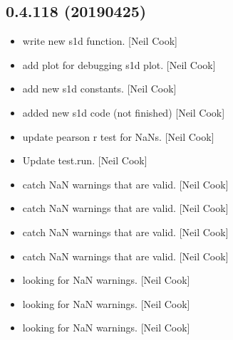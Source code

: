 \documentclass[a4paper,10pt,english]{report}
\begin{document}
\subsection{0.4.118 (2019\sphinxhyphen{}04\sphinxhyphen{}25)}
\label{\detokenize{misc/changelog:id162}}\begin{itemize}
\item {} 
 \sphinxhyphen{} write new s1d function. {[}Neil Cook{]}

\item {} 
 \sphinxhyphen{} add  plot for debugging s1d
plot. {[}Neil Cook{]}

\item {} 
 \sphinxhyphen{} add new s1d constants. {[}Neil Cook{]}

\item {} 
 \sphinxhyphen{} added new s1d code (not finished) {[}Neil
Cook{]}

\item {} 
 \sphinxhyphen{} update pearson r test for NaNs. {[}Neil Cook{]}

\item {} 
Update test.run. {[}Neil Cook{]}

\item {} 
 \sphinxhyphen{} catch NaN warnings that are valid. {[}Neil Cook{]}

\item {} 
 \sphinxhyphen{} catch NaN warnings that are valid. {[}Neil Cook{]}

\item {} 
 \sphinxhyphen{} catch NaN warnings that are valid. {[}Neil Cook{]}

\item {} 
 \sphinxhyphen{} catch NaN warnings that are valid. {[}Neil Cook{]}

\item {} 
 \sphinxhyphen{} looking for NaN warnings. {[}Neil Cook{]}

\item {} 
 \sphinxhyphen{} looking for NaN warnings. {[}Neil Cook{]}

\item {} 
 \sphinxhyphen{} looking for NaN warnings. {[}Neil Cook{]}


\end{itemize}
\end{document}
